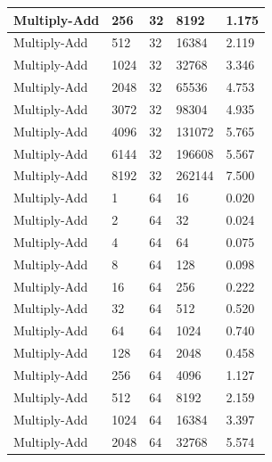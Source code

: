 \documentclass{article}
\begin{document}
\begin{longtable}{|l|l|l|l|l|}
Multiply-Add       & 256  & 32          & 8192              & 1.175             \\ \hline
Multiply-Add       & 512  & 32          & 16384             & 2.119             \\ \hline
Multiply-Add       & 1024 & 32          & 32768             & 3.346             \\ \hline
Multiply-Add       & 2048 & 32          & 65536             & 4.753             \\ \hline
Multiply-Add       & 3072 & 32          & 98304             & 4.935             \\ \hline
Multiply-Add       & 4096 & 32          & 131072            & 5.765             \\ \hline
Multiply-Add       & 6144 & 32          & 196608            & 5.567             \\ \hline
Multiply-Add       & 8192 & 32          & 262144            & 7.500             \\ \hline
Multiply-Add       & 1    & 64          & 16                & 0.020             \\ \hline
Multiply-Add       & 2    & 64          & 32                & 0.024             \\ \hline
Multiply-Add       & 4    & 64          & 64                & 0.075             \\ \hline
Multiply-Add       & 8    & 64          & 128               & 0.098             \\ \hline
Multiply-Add       & 16   & 64          & 256               & 0.222             \\ \hline
Multiply-Add       & 32   & 64          & 512               & 0.520             \\ \hline
Multiply-Add       & 64   & 64          & 1024              & 0.740             \\ \hline
Multiply-Add       & 128  & 64          & 2048              & 0.458             \\ \hline
Multiply-Add       & 256  & 64          & 4096              & 1.127             \\ \hline
Multiply-Add       & 512  & 64          & 8192              & 2.159             \\ \hline
Multiply-Add       & 1024 & 64          & 16384             & 3.397             \\ \hline
Multiply-Add       & 2048 & 64          & 32768             & 5.574             \\ \hline

\end{longtable}
\end{document}
